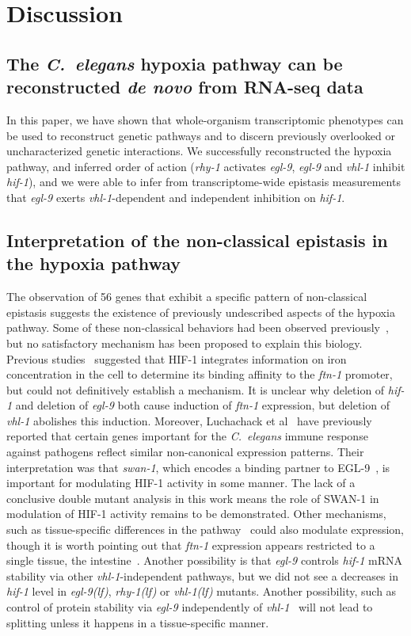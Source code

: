 \documentclass[9pt,twocolumn,twoside]{pnas-new}
\newcommand{\cel}{\emph{C.~elegans}}
\newcommand{\gene}[1]{\mbox{\emph{#1}}}
\newcommand{\ftna}{\gene{ftn-1}}
\newcommand{\egl}{\gene{egl-9(lf)}}
\newcommand{\rhy}{\gene{rhy-1(lf)}}
\newcommand{\vhl}{\gene{vhl-1(lf)}}
\newcommand{\eglp}{EGL-9}
\newcommand{\hifp}{HIF-1}
\newcommand{\hifohtargets}{56}
\begin{document}
\section*{Discussion}
\label{sec:discussion}
\subsection*{The \cel{} hypoxia pathway can be reconstructed \emph{de novo} from
             RNA-seq data}
In this paper, we have shown that whole-organism transcriptomic phenotypes can
be used to reconstruct genetic pathways and to discern previously overlooked or
uncharacterized genetic interactions. We successfully reconstructed the hypoxia
pathway, and inferred order of action (\gene{rhy-1} activates \gene{egl-9},
\gene{egl-9} and \gene{vhl-1} inhibit \gene{hif-1}), and we were able to infer
from transcriptome-wide epistasis measurements that \gene{egl-9} exerts
\gene{vhl-1}-dependent and independent inhibition on \gene{hif-1}.

\subsection*{Interpretation of the non-classical epistasis in the hypoxia pathway}
The observation of \hifohtargets{} genes that exhibit a specific pattern of
non-classical epistasis suggests the existence of previously undescribed aspects
of the hypoxia pathway. Some of these non-classical behaviors had been observed
previously~\cite{Ackerman2012,Romney2011,Luhachack2012}, but no satisfactory
mechanism has been proposed to explain this biology. Previous
studies~\cite{Romney2011,Ackerman2012} suggested that \hifp{} integrates
information on iron concentration in the cell to determine its binding affinity
to the \ftna{} promoter, but could not definitively establish a mechanism. It is
unclear why deletion of \gene{hif-1} and deletion of \gene{egl-9} both cause
induction of \ftna{} expression, but deletion of \gene{vhl-1} abolishes this
induction. Moreover, Luchachack et al~\cite{Luhachack2012} have previously
reported that certain genes important for the \cel{} immune response against
pathogens reflect similar non-canonical expression patterns. Their
interpretation was that \gene{swan-1}, which encodes a binding partner to
\eglp{}~\cite{Shao2010}, is important for modulating \hifp{} activity in some
manner. The lack of a conclusive double mutant analysis in this work means the
role of SWAN-1 in modulation of \hifp{} activity remains to be demonstrated.
Other mechanisms, such as tissue-specific differences in the
pathway~\cite{Budde2010} could also modulate expression, though it is worth
pointing out that \ftna{} expression appears restricted to a single tissue, the
intestine~\cite{Kim2004}. Another possibility is that \gene{egl-9} controls
\gene{hif-1} mRNA stability via other \gene{vhl-1}-independent pathways, but we
did not see a decreases in \gene{hif-1} level in \egl{}, \rhy{} or \vhl{} mutants.
Another possibility, such as control of protein stability via \gene{egl-9}
independently of \gene{vhl-1}~\cite{Chintala2012} will not lead to splitting
unless it happens in a tissue-specific manner.
\end{document}
